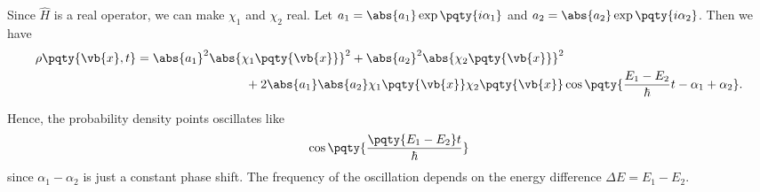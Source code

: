 \begin{example}
    Since \(\hat{H}\) is a real operator, we can make \(\chi_1\) and \(\chi_2\) real. Let \(a_1 = \abs{a_1} \exp\pqty{i \alpha_1}\) and \(a_2 = \abs{a_2} \exp\pqty{i \alpha_2}\). Then we have
    \begin{equation}
        \begin{split}
        \rho\pqty{\vb{x}, t} &= \abs{a_1}^2 \abs{\chi_1\pqty{\vb{x}}}^2 + \abs{a_2}^2 \abs{\chi_2\pqty{\vb{x}}}^2 \\
        &\phantom{=} \hspace{8em} + 2 \abs{a_1} \abs{a_2} \chi_1\pqty{\vb{x}} \chi_2\pqty{\vb{x}} \cos\pqty{\frac{E_1 - E_2}{\hbar} t - \alpha_1 + \alpha_2}.
        \end{split}
    \end{equation}
    
    Hence, the probability density points oscillates like
    \begin{equation}
        \cos\pqty{\frac{\pqty{E_1 - E_2}t}{\hbar}}
    \end{equation}
    since \(\alpha_1 - \alpha_2\) is just a constant phase shift. The frequency of the oscillation depends on the energy difference \(\Delta E = E_1 - E_2\).
\end{example}